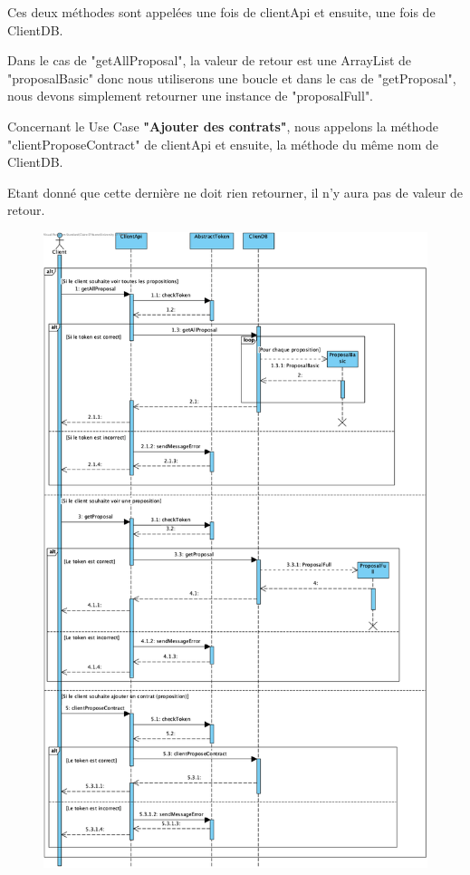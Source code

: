 \begin{flushleft}
Ces deux méthodes sont appelées une fois de clientApi et ensuite, une fois de ClientDB.
\end{flushleft}

\begin{flushleft}
Dans le cas de "getAllProposal", la valeur de retour est une ArrayList de "proposalBasic" donc nous utiliserons une boucle et dans le cas de "getProposal", nous devons simplement retourner une instance de "proposalFull".
\end{flushleft}

\begin{flushleft}
Concernant le Use Case \textbf{"Ajouter des contrats"}, nous appelons la méthode "clientProposeContract" de clientApi et ensuite, la méthode du même nom de ClientDB.
\end{flushleft}

\begin{flushleft}
Etant donné que cette dernière ne doit rien retourner, il n'y aura pas de valeur de retour.
\end{flushleft}

\newpage
\begin{figure}[h]
\centering
\includegraphics[height = 1.2\textwidth]{sequence/client/seqFCRe.png}
\end{figure}

